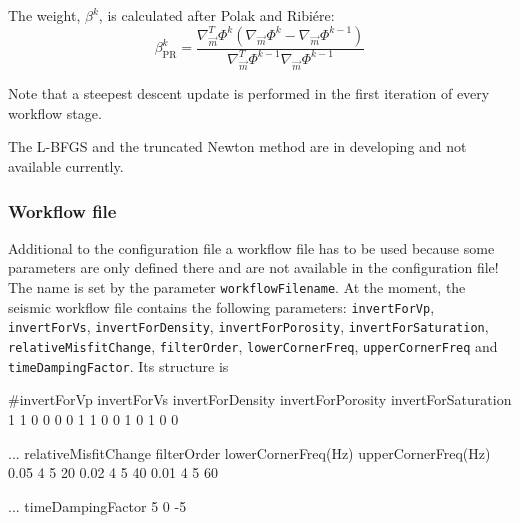 \documentclass[pdftex,a4paper,parskip,listof=totoc,bibliography=totoc,onehalfspacing,12pt]{scrreprt}
\begin{document}
The weight, $\beta^k$, is calculated after Polak and Ribi\'{e}re:
\begin{equation*}
 \beta^k_{\mathrm{PR}} = \frac{ \nabla_{\vec{m}}^T \Phi^k (\nabla_{\vec{m}} \Phi^k - \nabla_{\vec{m}} \Phi^{k-1}) }{\nabla_{\vec{m}}^T \Phi^{k-1} \nabla_{\vec{m}} \Phi^{k-1}}
\end{equation*}

Note that a steepest descent update is performed in the first iteration of every workflow stage.

The L-BFGS and the truncated Newton method are in developing and not available currently.

\subsubsection{Workflow file}
Additional to the configuration file a workflow file has to be used because some parameters are only defined there and are not available in the configuration file! The name is set by the parameter \verb+workflowFilename+. At the moment, the seismic workflow file contains the following parameters: \verb+invertForVp+, \verb+invertForVs+, \verb+invertForDensity+, \verb+invertForPorosity+, \verb+invertForSaturation+, \verb+relativeMisfitChange+, \verb+filterOrder+, \verb+lowerCornerFreq+, \verb+upperCornerFreq+ and \verb+timeDampingFactor+. Its structure is 
\begin{verbnobox}[\fontsize{11pt}{11pt}\selectfont]
#invertForVp invertForVs invertForDensity invertForPorosity invertForSaturation
      1           1            0                0                 0
      0           1            1                0                 0
      1           0            1                0                 0
\end{verbnobox}
\begin{verbnobox}[\fontsize{11pt}{11pt}\selectfont]
... relativeMisfitChange filterOrder lowerCornerFreq(Hz) upperCornerFreq(Hz)
             0.05            4             5                   20
             0.02            4             5                   40
             0.01            4             5                   60
\end{verbnobox}
\begin{verbnobox}[\fontsize{11pt}{11pt}\selectfont]
... timeDampingFactor
         5  
         0
        -5
\end{verbnobox}
\end{document}

